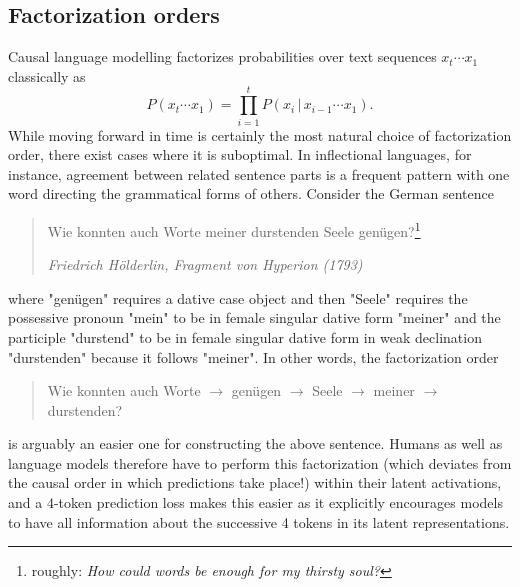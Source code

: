 \documentclass{article}
\theoremstyle{plain}
\theoremstyle{definition}
\theoremstyle{remark}
\begin{document}
\subsection{Factorization orders}
Causal language modelling factorizes probabilities over text sequences $x_t \cdots x_1$ classically as 
\[ P(x_t \cdots x_1) = \prod_{i=1}^t P(x_i \,|\, x_{i-1} \cdots x_1). \]
While moving forward in time is certainly the most natural choice of factorization order, there exist cases where it is suboptimal. In inflectional languages, for instance, agreement between related sentence parts is a frequent pattern with one word directing the grammatical forms of others. Consider the German sentence
\begin{quote}
Wie konnten auch Worte meiner durstenden Seele genügen?\footnote{roughly: \textit{How could words be enough for my thirsty soul?}}
\par\noindent\hfill\textit{Friedrich Hölderlin, Fragment von Hyperion (1793)}
\end{quote}
where "genügen" requires a dative case object and then "Seele" requires the possessive pronoun "mein" to be in female singular dative form "meiner" and the participle "durstend" to be in female singular dative form in weak declination "durstenden" because it follows "meiner". In other words, the factorization order
\begin{quote}
Wie konnten auch Worte $\rightarrow$ genügen $\rightarrow$ Seele $\rightarrow$ meiner $\rightarrow$ durstenden?
\end{quote}
is arguably an easier one for constructing the above sentence. Humans as well as language models therefore have to perform this factorization (which deviates from the causal order in which predictions take place!) within their latent activations, and a $4$-token prediction loss makes this easier as it explicitly encourages models to have all information about the successive 4 tokens in its latent representations.

\newpage
\end{document}
